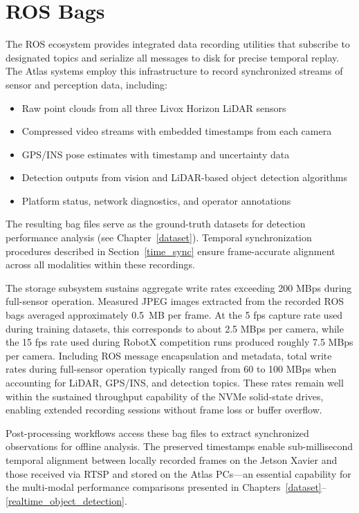 \documentclass{erauthesis}
\begin{document}
\section{ROS Bags} \label{ROS_bags}

The \ac{ROS} ecosystem provides integrated data recording utilities that subscribe to designated topics and serialize all messages to disk for precise temporal replay.
The Atlas systems employ this infrastructure to record synchronized streams of sensor and perception data, including:

\begin{itemize}
\item Raw point clouds from all three Livox Horizon \ac{LiDAR} sensors
\item Compressed video streams with embedded timestamps from each camera
\item GPS/INS pose estimates with timestamp and uncertainty data
\item Detection outputs from vision and \ac{LiDAR}-based object detection algorithms
\item Platform status, network diagnostics, and operator annotations
\end{itemize}

The resulting bag files serve as the ground-truth datasets for detection performance analysis (see Chapter~\ref{dataset}).
Temporal synchronization procedures described in Section~\ref{time_sync} ensure frame-accurate alignment across all modalities within these recordings.

The storage subsystem sustains aggregate write rates exceeding 200 MBps during full-sensor operation.
Measured JPEG images extracted from the recorded ROS bags averaged approximately 0.5~MB per frame.
At the 5 fps capture rate used during training datasets, this corresponds to about 2.5 MBps per camera, while the 15 fps rate used during RobotX competition runs produced roughly 7.5 MBps per camera. 
Including ROS message encapsulation and metadata, total write rates during full-sensor operation typically ranged from 60 to 100 MBps when accounting for LiDAR, GPS/INS, and detection topics. 
These rates remain well within the sustained throughput capability of the NVMe solid-state drives, enabling extended recording sessions without frame loss or buffer overflow.

Post-processing workflows access these bag files to extract synchronized observations for offline analysis.
The preserved timestamps enable sub-millisecond temporal alignment between locally recorded frames on the Jetson Xavier and those received via RTSP and stored on the Atlas PCs—an essential capability for the multi-modal performance comparisons presented in Chapters~\ref{dataset}–\ref{realtime_object_detection}.
\end{document}
